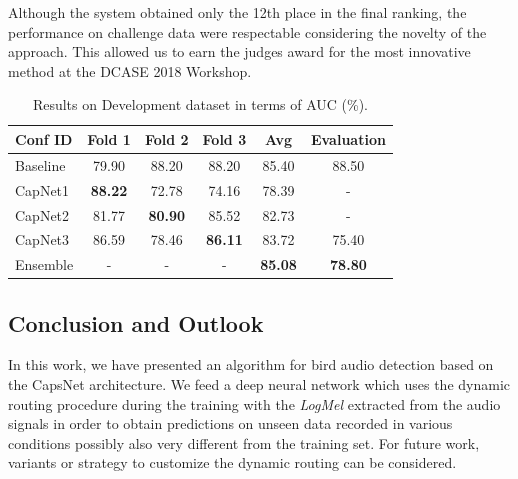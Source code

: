 Although the system obtained only the 12th place in the final ranking, the performance on challenge data were respectable considering the novelty of the approach. This allowed us to earn the judges award for the most innovative method at the DCASE 2018 Workshop.

\begin{table}[t]
	\centering
	\begin{tabular}{|l|c|c|c|c|c|}
		\hline
		Conf ID & Fold 1 & Fold 2	& Fold 3 & Avg & Evaluation \\
		\hline
		Baseline &	79.90	&	88.20		&	88.20	& 85.40 &  88.50		\\
		\hline
		CapNet1	&  \textbf{88.22} & 72.78	& 74.16	& 78.39 & -	\\
		CapNet2	&  81.77 &  \textbf{80.90} 	& 85.52	& 82.73	& 	- \\
		CapNet3	&  86.59 & 78.46	&  \textbf{86.11}	&  83.72 				& 75.40   \\
		Ensemble &	-	 & 		-	&		-			&		\textbf{85.08}  & \textbf{78.80} \\
		\hline		
	\end{tabular}
	\caption[CapsNet for Bird Audio Detection - Results]{Results on Development dataset in terms of AUC (\%).}
	\label{tab:results}
\end{table}


\subsection{Conclusion and Outlook}
\label{sec:conclusion}

In this work, we have presented an algorithm for bird audio detection based on the CapsNet architecture. We feed a deep neural network which uses the dynamic routing procedure during the training with the \textit{LogMel} extracted from the audio signals in order to obtain predictions on unseen data recorded in various conditions possibly also very different from the training set.  
For future work, variants \cite{hinton2018matrix} or strategy to customize the dynamic routing can be considered.

